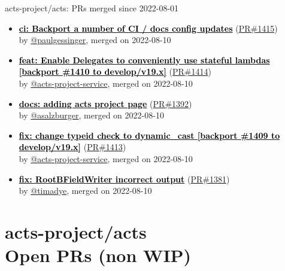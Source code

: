 \begin{frame}[allowframebreaks]{ acts-project/acts: PRs merged since 2022-08-01 }
\begin{itemize}
    \item
    \textbf{\href{https://github.com/acts-project/acts/pull/1415}{\textcolor{black}{ci: Backport a number of CI / docs config updates}}}
    (\href{https://github.com/acts-project/acts/pull/1415}{PR\#1415}) \\
    by \href{https://github.com/paulgessinger}{ @paulgessinger}, merged on 2022-08-10

    \item
    \textbf{\href{https://github.com/acts-project/acts/pull/1414}{\textcolor{black}{feat: Enable Delegates to conveniently use stateful lambdas [backport \#1410 to develop/v19.x]}}}
    (\href{https://github.com/acts-project/acts/pull/1414}{PR\#1414}) \\
    by \href{https://github.com/acts-project-service}{ @acts-project-service}, merged on 2022-08-10

    \item
    \textbf{\href{https://github.com/acts-project/acts/pull/1392}{\textcolor{black}{docs: adding acts project page}}}
    (\href{https://github.com/acts-project/acts/pull/1392}{PR\#1392}) \\
    by \href{https://github.com/asalzburger}{ @asalzburger}, merged on 2022-08-10

    \item
    \textbf{\href{https://github.com/acts-project/acts/pull/1413}{\textcolor{black}{fix: change typeid check to dynamic\_cast [backport \#1409 to develop/v19.x]}}}
    (\href{https://github.com/acts-project/acts/pull/1413}{PR\#1413}) \\
    by \href{https://github.com/acts-project-service}{ @acts-project-service}, merged on 2022-08-10

    \item
    \textbf{\href{https://github.com/acts-project/acts/pull/1381}{\textcolor{black}{fix: RootBFieldWriter incorrect output}}}
    (\href{https://github.com/acts-project/acts/pull/1381}{PR\#1381}) \\
    by \href{https://github.com/timadye}{ @timadye}, merged on 2022-08-10

  \end{itemize}

\end{frame}



\section{ acts-project/acts \\ Open PRs (non WIP)}

